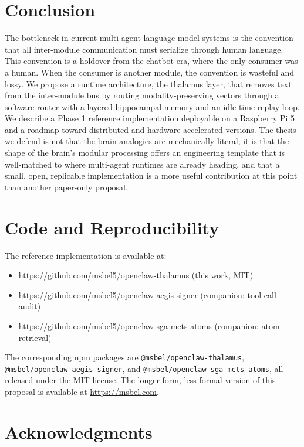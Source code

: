 \documentclass[11pt]{article}
\begin{document}
\section{Conclusion}

The bottleneck in current multi-agent language model systems is
the convention that all inter-module communication must
serialize through human language. This convention is a holdover
from the chatbot era, where the only consumer was a human. When
the consumer is another module, the convention is wasteful and
lossy. We propose a runtime architecture, the thalamus layer,
that removes text from the inter-module bus by routing
modality-preserving vectors through a software router with a
layered hippocampal memory and an idle-time replay loop. We
describe a Phase 1 reference implementation deployable on a
Raspberry Pi 5 and a roadmap toward distributed and
hardware-accelerated versions. The thesis we defend is not that
the brain analogies are mechanically literal; it is that the
shape of the brain's modular processing offers an engineering
template that is well-matched to where multi-agent runtimes are
already heading, and that a small, open, replicable
implementation is a more useful contribution at this point than
another paper-only proposal.

\section*{Code and Reproducibility}

The reference implementation is available at:
\begin{itemize}[leftmargin=2em,itemsep=0pt]
  \item \url{https://github.com/msbel5/openclaw-thalamus} (this work, MIT)
  \item \url{https://github.com/msbel5/openclaw-aegis-signer} (companion: tool-call audit)
  \item \url{https://github.com/msbel5/openclaw-sga-mcts-atoms} (companion: atom retrieval)
\end{itemize}

\noindent
The corresponding npm packages are
\texttt{@msbel/openclaw-thalamus},
\texttt{@msbel/openclaw-aegis-signer}, and
\texttt{@msbel/openclaw-sga-mcts-atoms}, all released under
the MIT license. The longer-form, less formal version of this
proposal is available at \url{https://msbel.com}.

\section*{Acknowledgments}
\end{document}
